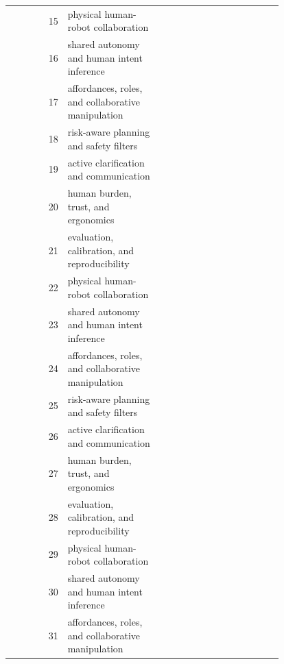 \documentclass{article}
\begin{document}
\begin{longtable}{r p{0.34\linewidth} p{0.45\linewidth}}
15 & physical human-robot collaboration & \citep{nobile2024a43,ranz2017capabilitybased44,wang2022digital45} \\
16 & shared autonomy and human intent inference & \citep{reed2008physical46,music2020haptic47,alyacoub2020effective48} \\
17 & affordances, roles, and collaborative manipulation & \citep{luo2026a49,spaa2024simultaneously50,maccarini2022preferencebased51} \\
18 & risk-aware planning and safety filters & \citep{nikolakis2018a52,vogel2013a53,pan2026force54} \\
19 & active clarification and communication & \citep{lahr2026a55,brawer2018situated56,iqbal2021detachable57} \\
20 & human burden, trust, and ergonomics & \citep{tan2011triple58,zafar2024exploring59,zheng2023a60} \\
21 & evaluation, calibration, and reproducibility & \citep{lorenzini2023ergonomic61,chen2022an62,askarpour2020how63} \\
22 & physical human-robot collaboration & \citep{inkulu2022challenges64,hoffman2024inferring65,armleder2022interactive66} \\
23 & shared autonomy and human intent inference & \citep{marinelli2023from67,shah2025advancements68,hopko2022human69} \\
24 & affordances, roles, and collaborative manipulation & \citep{hoffman2019evaluating70,chen2026perceptiondecisionexecution71,carissoli2023mental72} \\
25 & risk-aware planning and safety filters & \citep{gorur2021fabric73,simone2022humanrobot74,lippi2021a75} \\
26 & active clarification and communication & \citep{costa2022augmented76,ramasubramanian2022digital77,zheng2022a78} \\
27 & human burden, trust, and ergonomics & \citep{pietrantoni2024integrating79,gervasi2022user80,lou2024a81} \\
28 & evaluation, calibration, and reproducibility & \citep{puranik2024study82,garcia2020humanrobot83,gualtieri2021development84} \\
29 & physical human-robot collaboration & \citep{strabala2012learning85,falerni2024a86,keshvarparast2024ergonomic87} \\
30 & shared autonomy and human intent inference & \citep{b2025assessing88,castro2021trends89,callari2024an90} \\
31 & affordances, roles, and collaborative manipulation & \citep{costanzo2021a91,salunkhe2023specifying92,scalera2022enhancing93} \\

\end{longtable}
\end{document}

